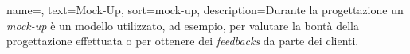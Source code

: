 
\renewcommand{\acronymname}{Acronimi e abbreviazioni}




{
    name=,
    text=Mock-Up,
    sort=mock-up,
    description={Durante la progettazione un \emph{mock-up} è un modello utilizzato, ad esempio, per valutare la bontà della progettazione effettuata o per ottenere dei \emph{feedbacks} da parte dei clienti.}
}
